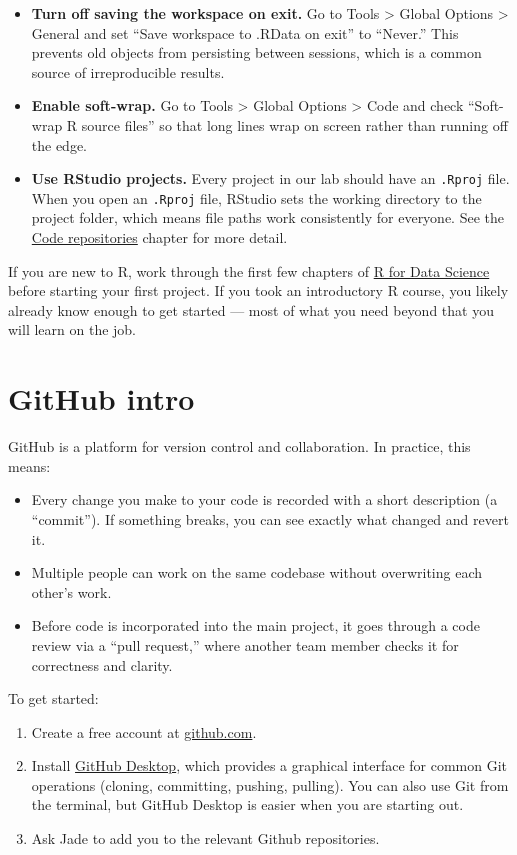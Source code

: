 \documentclass[
]{book}
\providecommand{\tightlist}{%
  \setlength{\itemsep}{0pt}\setlength{\parskip}{0pt}}
\begin{document}
\begin{itemize}
\tightlist
\item
  \textbf{Turn off saving the workspace on exit.} Go to Tools \textgreater{} Global Options \textgreater{} General and set ``Save workspace to .RData on exit'' to ``Never.'' This prevents old objects from persisting between sessions, which is a common source of irreproducible results.
\item
  \textbf{Enable soft-wrap.} Go to Tools \textgreater{} Global Options \textgreater{} Code and check ``Soft-wrap R source files'' so that long lines wrap on screen rather than running off the edge.
\item
  \textbf{Use RStudio projects.} Every project in our lab should have an \texttt{.Rproj} file. When you open an \texttt{.Rproj} file, RStudio sets the working directory to the project folder, which means file paths work consistently for everyone. See the \href{code-repositories.html}{Code repositories} chapter for more detail.
\end{itemize}

If you are new to R, work through the first few chapters of \href{https://r4ds.had.co.nz/}{R for Data Science} before starting your first project. If you took an introductory R course, you likely already know enough to get started --- most of what you need beyond that you will learn on the job.

\section{GitHub intro}\label{github-intro}

GitHub is a platform for version control and collaboration. In practice, this means:

\begin{itemize}
\tightlist
\item
  Every change you make to your code is recorded with a short description (a ``commit''). If something breaks, you can see exactly what changed and revert it.
\item
  Multiple people can work on the same codebase without overwriting each other's work.
\item
  Before code is incorporated into the main project, it goes through a code review via a ``pull request,'' where another team member checks it for correctness and clarity.
\end{itemize}

To get started:

\begin{enumerate}
\def\labelenumi{\arabic{enumi}.}
\tightlist
\item
  Create a free account at \href{https://github.com}{github.com}.
\item
  Install \href{https://desktop.github.com/}{GitHub Desktop}, which provides a graphical interface for common Git operations (cloning, committing, pushing, pulling). You can also use Git from the terminal, but GitHub Desktop is easier when you are starting out.
\item
  Ask Jade to add you to the relevant Github repositories.
\end{enumerate}
\end{document}
